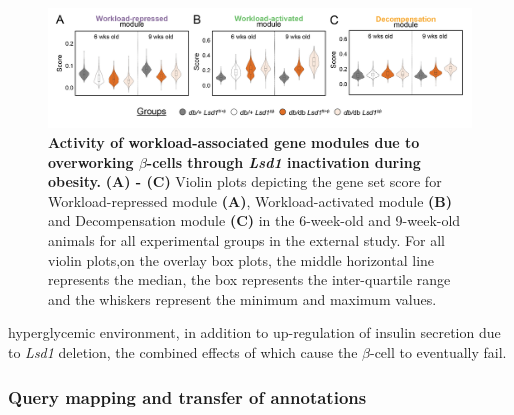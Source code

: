 \begin{figure}[H]
    \centering
    \includegraphics[width=\linewidth]{Chapter5/Fig/F3-17-01.png}
    \caption[Activity of workload-associated gene modules in the external study]{\textbf{Activity of workload-associated gene modules due to overworking $\beta$-cells through \textit{Lsd1} inactivation during obesity.} \textbf{(A) - (C)} Violin plots depicting the gene set score for Workload-repressed module \textbf{(A)}, Workload-activated module \textbf{(B)} and Decompensation module \textbf{(C)} in the 6-week-old and 9-week-old animals for all experimental groups in the external study. For all violin plots,on the overlay box plots, the middle horizontal line represents the median, the box represents the inter-quartile range and the whiskers represent the minimum and maximum values.}
    \label{fig:chp3_valid_study_genescores}
\end{figure}

hyperglycemic environment, in addition to up-regulation of insulin secretion due to \textit{Lsd1} deletion, the combined effects of which cause the $\beta$-cell to eventually fail.

\subsubsection{\large Query mapping and transfer of annotations}

